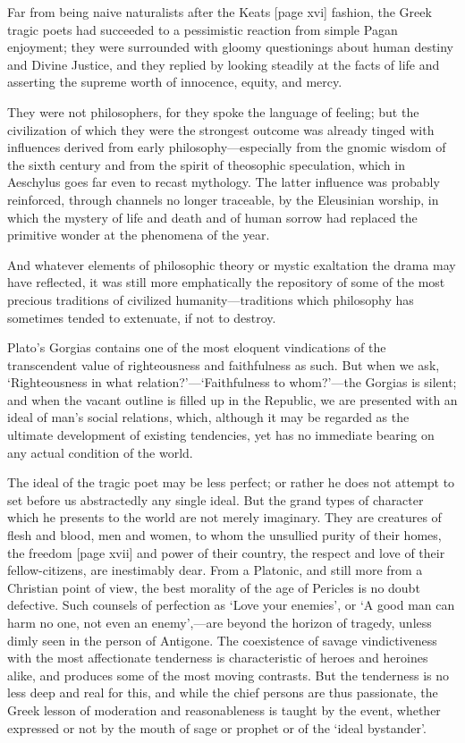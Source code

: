 \documentclass[11pt,letter]{book}
\begin{document}
\par  Far from being naive naturalists after the Keats [page xvi] fashion, the Greek tragic poets had succeeded to a pessimistic reaction from simple Pagan enjoyment; they were surrounded with gloomy questionings about human destiny and Divine Justice, and they replied by looking steadily at the facts of life and asserting the supreme worth of innocence, equity, and mercy.

\par  They were not philosophers, for they spoke the language of feeling; but the civilization of which they were the strongest outcome was already tinged with influences derived from early philosophy—especially from the gnomic wisdom of the sixth century and from the spirit of theosophic speculation, which in Aeschylus goes far even to recast mythology. The latter influence was probably reinforced, through channels no longer traceable, by the Eleusinian worship, in which the mystery of life and death and of human sorrow had replaced the primitive wonder at the phenomena of the year.

\par  And whatever elements of philosophic theory or mystic exaltation the drama may have reflected, it was still more emphatically the repository of some of the most precious traditions of civilized humanity—traditions which philosophy has sometimes tended to extenuate, if not to destroy.

\par  Plato’s Gorgias contains one of the most eloquent vindications of the transcendent value of righteousness and faithfulness as such. But when we ask, ‘Righteousness in what relation?’—‘Faithfulness to whom?’—the Gorgias is silent; and when the vacant outline is filled up in the Republic, we are presented with an ideal of man’s social relations, which, although it may be regarded as the ultimate development of existing tendencies, yet has no immediate bearing on any actual condition of the world.

\par  The ideal of the tragic poet may be less perfect; or rather he does not attempt to set before us abstractedly any single ideal. But the grand types of character which he presents to the world are not merely imaginary. They are creatures of flesh and blood, men and women, to whom the unsullied purity of their homes, the freedom [page xvii] and power of their country, the respect and love of their fellow-citizens, are inestimably dear. From a Platonic, and still more from a Christian point of view, the best morality of the age of Pericles is no doubt defective. Such counsels of perfection as ‘Love your enemies’, or ‘A good man can harm no one, not even an enemy’,—are beyond the horizon of tragedy, unless dimly seen in the person of Antigone. The coexistence of savage vindictiveness with the most affectionate tenderness is characteristic of heroes and heroines alike, and produces some of the most moving contrasts. But the tenderness is no less deep and real for this, and while the chief persons are thus passionate, the Greek lesson of moderation and reasonableness is taught by the event, whether expressed or not by the mouth of sage or prophet or of the ‘ideal bystander’.
\end{document}
